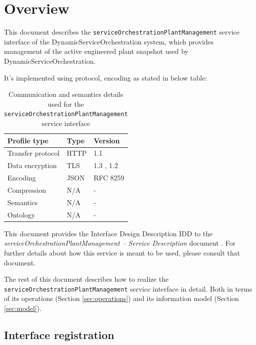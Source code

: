 \documentclass[a4paper]{arrowhead}
\begin{document}
\section{Overview}
\label{sec:overview}

This document describes the \texttt{service\allowbreak{}Orchestration\allowbreak{}Plant\allowbreak{}Management} service interface of the DynamicServiceOrchestration system, which provides management of the active engineered plant snapshot used by Dynamic\allowbreak{}Service\allowbreak{}Orchestration.

It's implemented using protocol, encoding as stated in below table:
\begin{table}[ht!]
  \centering
  \begin{tabular}{|l|l|l|}
    \hline
    \rowcolor{gray!33} Profile type & Type & Version \\ \hline
    Transfer protocol & HTTP & 1.1 \cite{rfc9112} \\ \hline
    Data encryption & TLS & 1.3 \cite{rfc8446}, 1.2 \cite{rfc5246} \\ \hline
    Encoding & JSON & RFC 8259 \cite{rfc8259} \\ \hline
    Compression & N/A & - \\ \hline
    Semantics & N/A & - \\ \hline
    Ontology & N/A & - \\ \hline
  \end{tabular}
  \caption{Communication and semantics details used for the \texttt{service\allowbreak{}Orchestration\allowbreak{}Plant\allowbreak{}Management} service interface}
  \label{tab:comunication_semantics_profile}
\end{table}

This document provides the Interface Design Description IDD to the \textit{serviceOrchestrationPlantManagement -- Service Description} document \cite{dso-serviceOrchestrationPlantManagement-sd}.
For further details about how this service is meant to be used, please consult that document.

The rest of this document describes how to realize the \texttt{service\allowbreak{}Orchestration\allowbreak{}Plant\allowbreak{}Management} service
interface in detail. Both in terms of its operations (Section \ref{sec:operations}) and its information model (Section \ref{sec:model}).

\subsection{Interface registration}
\end{document}

